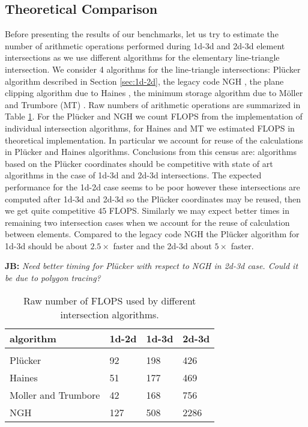 \documentclass{elsarticle}
\newcommand{\noteJB}[1]{{\color{Blue} \textbf{JB: } \textit{#1}}}
\newcommand{\plucker}{Pl\"{u}cker }
\newcommand{\ngh}{NGH }
\begin{document}
\subsection{Theoretical Comparison}
Before presenting the results of our benchmarks, let us try to estimate the number of arithmetic operations performed during 1d-3d and 2d-3d element intersections
as we use different algorithms for the elementary line-triangle intersection. We consider 4 algorithms for the line-triangle intersections: \plucker algorithm 
described in Section \ref{sec:1d-2d}, the legacy code \ngh, the plane clipping algorithm due to Haines \cite{haines_fast_1991}, the minimum storage
algorithm due to Möller and Trumbore (MT) \cite{moller_fast_1997}. Raw numbers of arithmetic operations are summarized in Table \ref{tab:fundamental_flops}.
For the \plucker and \ngh we count FLOPS from the implementation of individual intersection algorithms, for Haines and MT we estimated FLOPS in theoretical 
implementation. In particular we account for reuse of the calculations in \plucker and Haines algorithms. Conclusions from this census are:
algorithms based on the \plucker coordinates should be competitive with state of art algorithms in the case of 1d-3d and 2d-3d intersections. The expected performance
for the 1d-2d case seems to be poor however these intersections are computed after 1d-3d and 2d-3d so the \plucker coordinates may be reused, then we get 
quite competitive $45$ FLOPS. Similarly we may expect better times in remaining two intersection cases when we account for the reuse of calculation between elements.
Compared to the legacy code \ngh the \plucker algorithm for 1d-3d should be about $2.5\times$ faster and the 2d-3d about $5\times$ faster.

\noteJB{Need better timing for \plucker with respect to NGH in 
2d-3d  case. Could it be due to polygon tracing?}

\begin{table}[!htb]
    \caption{Raw number of FLOPS used by different intersection algorithms.}    
    \label{tab:fundamental_flops}
    \centering
    \renewcommand{\arraystretch}{1.2}
    \begin{tabular}[b]{l|lll}
            algorithm           & 1d-2d         & 1d-3d         & 2d-3d \\                      
            \hline\\
            \plucker           & 92            & 198           & 426\\
            Haines              & 51            & 177           & 469\\
            Moller and Trumbore & 42            & 168           & 756\\
            \ngh                & 127           & 508           & 2286\\
    \end{tabular}
    
\end{table}
\end{document}
